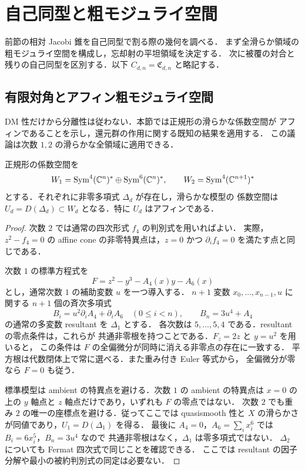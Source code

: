 \section{自己同型と粗モジュライ空間}
\label{sec:coarse}

前節の相対 Jacobi 錐を自己同型で割る際の幾何を調べる．
まず全滑らか領域の粗モジュライ空間を構成し，忘却射の平坦領域を決定する．
次に被覆の対合と残りの自己同型を区別する．以下 $C_{d,n}=\mathfrak C_{d,n}$ と略記する．

\subsection{有限対角とアフィン粗モジュライ空間}

DM 性だけから分離性は従わない．本節では正規形の滑らかな係数空間が
アフィンであることを示し，還元群の作用に関する既知の結果を適用する．
この議論は次数 $1,2$ の滑らかな全領域に適用できる．

\begin{lemma}[正規形の判別式開集合]
\label{lemma:affine-parameter-open}
正規形の係数空間を
\[
 W_1=\operatorname{Sym}^4(\mathbb C^n)^*\oplus
       \operatorname{Sym}^6(\mathbb C^n)^*,\qquad
 W_2=\operatorname{Sym}^4(\mathbb C^{n+1})^*
\]
とする．それぞれに非零多項式 $\Delta_d$ が存在し，滑らかな模型の
係数空間は $U_d=D(\Delta_d)\subset W_d$ となる．特に $U_d$ はアフィンである．
\end{lemma}

\begin{proof}
次数 $2$ では通常の四次形式 $f_4$ の判別式を用いればよい．
実際，$z^2-f_4=0$ の affine cone の非零特異点は，$z=0$ かつ
$\partial_i f_4=0$ を満たす点と同じである．

次数 $1$ の標準方程式を
\[
 F=z^2-y^3-A_4(x)y-A_6(x)
\]
とし，通常次数 $1$ の補助変数 $u$ を一つ導入する．
$n+1$ 変数 $x_0,\ldots,x_{n-1},u$ に関する $n+1$ 個の斉次多項式
\[
 B_i=u^2\partial_i A_4+\partial_i A_6\quad(0\leq i<n),\qquad
 B_n=3u^4+A_4
\]
の通常の多変数 resultant を $\Delta_1$ とする．
各次数は $5,\ldots,5,4$ である．resultant の零点条件は，これらが
共通非零根を持つことである．$F_z=2z$ と $y=u^2$ を用いると，
この条件は $F$ の全偏微分が同時に消える非零点の存在に一致する．
平方根は代数閉体上で常に選べる．また重み付き Euler 等式から，
全偏微分が零なら $F=0$ も従う．

標準模型は ambient の特異点を避ける．次数 $1$ の ambient の特異点は
$x=0$ の上の $y$ 軸点と $z$ 軸点だけであり，いずれも $F$ の零点ではない．
次数 $2$ でも重み $2$ の唯一の座標点を避ける．従ってここでは
quasismooth 性と $X$ の滑らかさが同値であり，$U_1=D(\Delta_1)$ を得る．
最後に $A_4=0$，$A_6=\sum_i x_i^6$ では $B_i=6x_i^5$，$B_n=3u^4$ なので
共通非零根はなく，$\Delta_1$ は零多項式ではない．
$\Delta_2$ についても Fermat 四次式で同じことを確認できる．
ここでは resultant の因子分解や最小の被約判別式の同定は必要ない．
\end{proof}

